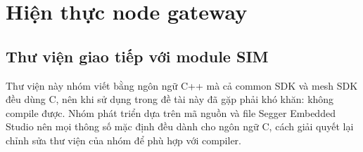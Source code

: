     \section{Hiện thực node gateway}
        \subsection{Thư viện giao tiếp với module SIM}
        Thư viện này nhóm viết bằng ngôn ngữ C++ mà cả common SDK và mesh SDK đều dùng C, nên khi sử dụng trong đề tài này đã gặp phải khó khăn: không compile được. Nhóm phát triển dựa trên mã nguồn và file Segger Embedded Studio nên mọi thông số mặc định đều dành cho ngôn ngữ C, cách giải quyết lại chỉnh sửa thư viện của nhóm để phù hợp với compiler.

